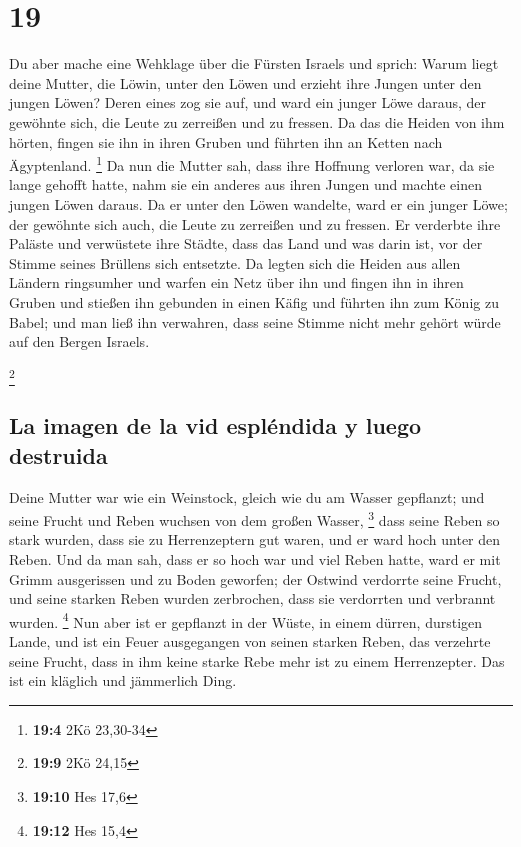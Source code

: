 \hypertarget{section-18}{%
\section{19}\label{section-18}}

 Du aber mache eine Wehklage über die Fürsten Israels
 und sprich: Warum liegt deine Mutter, die Löwin, unter
den Löwen und erzieht ihre Jungen unter den jungen Löwen? 
Deren eines zog sie auf, und ward ein junger Löwe daraus, der gewöhnte
sich, die Leute zu zerreißen und zu fressen.  Da das die
Heiden von ihm hörten, fingen sie ihn in ihren Gruben und führten ihn an
Ketten nach Ägyptenland. \footnote{\textbf{19:4} 2Kö 23,30-34}
 Da nun die Mutter sah, dass ihre Hoffnung verloren war,
da sie lange gehofft hatte, nahm sie ein anderes aus ihren Jungen und
machte einen jungen Löwen daraus.  Da er unter den Löwen
wandelte, ward er ein junger Löwe; der gewöhnte sich auch, die Leute zu
zerreißen und zu fressen.  Er verderbte ihre Paläste und
verwüstete ihre Städte, dass das Land und was darin ist, vor der Stimme
seines Brüllens sich entsetzte.  Da legten sich die Heiden
aus allen Ländern ringsumher und warfen ein Netz über ihn und fingen ihn
in ihren Gruben  und stießen ihn gebunden in einen Käfig
und führten ihn zum König zu Babel; und man ließ ihn verwahren, dass
seine Stimme nicht mehr gehört würde auf den Bergen Israels.

\footnote{\textbf{19:9} 2Kö 24,15}

\hypertarget{la-imagen-de-la-vid-espluxe9ndida-y-luego-destruida}{%
\subsection{La imagen de la vid espléndida y luego
destruida}\label{la-imagen-de-la-vid-espluxe9ndida-y-luego-destruida}}

 Deine Mutter war wie ein Weinstock, gleich wie du am
Wasser gepflanzt; und seine Frucht und Reben wuchsen von dem großen
Wasser, \footnote{\textbf{19:10} Hes 17,6}  dass seine
Reben so stark wurden, dass sie zu Herrenzeptern gut waren, und er ward
hoch unter den Reben. Und da man sah, dass er so hoch war und viel Reben
hatte,  ward er mit Grimm ausgerissen und zu Boden
geworfen; der Ostwind verdorrte seine Frucht, und seine starken Reben
wurden zerbrochen, dass sie verdorrten und verbrannt wurden. \footnote{\textbf{19:12}
  Hes 15,4}  Nun aber ist er gepflanzt in der Wüste, in
einem dürren, durstigen Lande,  und ist ein Feuer
ausgegangen von seinen starken Reben, das verzehrte seine Frucht, dass
in ihm keine starke Rebe mehr ist zu einem Herrenzepter. Das ist ein
kläglich und jämmerlich Ding.

